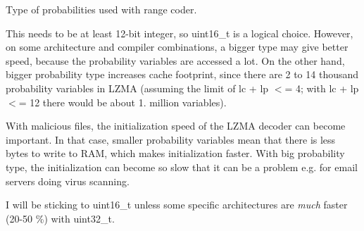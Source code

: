 Type of probabilities used with range coder. 

This needs to be at least 12-\/bit integer, so uint16\-\_\-t is a logical choice. However, on some architecture and compiler combinations, a bigger type may give better speed, because the probability variables are accessed a lot. On the other hand, bigger probability type increases cache footprint, since there are 2 to 14 thousand probability variables in L\-Z\-M\-A (assuming the limit of lc + lp $<$= 4; with lc + lp $<$= 12 there would be about 1. million variables).

With malicious files, the initialization speed of the L\-Z\-M\-A decoder can become important. In that case, smaller probability variables mean that there is less bytes to write to R\-A\-M, which makes initialization faster. With big probability type, the initialization can become so slow that it can be a problem e.\-g. for email servers doing virus scanning.

I will be sticking to uint16\-\_\-t unless some specific architectures are {\itshape much} faster (20-\/50 \%) with uint32\-\_\-t. 